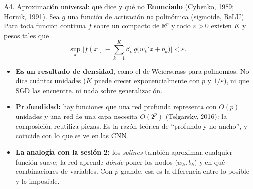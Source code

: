 \documentclass{beamer}
\newcommand{\1}{\mathbb{I}}
\begin{document}
\begin{frame}{A4. Aproximación universal: qué dice y qué no}
\small
\textbf{Enunciado} (Cybenko, 1989; Hornik, 1991). Sea $g$ una función de activación no polinómica (sigmoide, ReLU). Para toda función continua $f$ sobre un compacto de $\mathbb{R}^p$ y todo $\varepsilon > 0$ existen $K$ y pesos tales que
\[ \sup_{x} \Big| f(x) - \sum_{k=1}^{K} \beta_k\, g\big(w_k' x + b_k\big) \Big| < \varepsilon. \]
\pause
\begin{itemize}\itemsep3pt
  \item \textbf{Es un resultado de densidad}, como el de Weierstrass para polinomios. No dice cuántas unidades ($K$ puede crecer exponencialmente con $p$ y $1/\varepsilon$), ni que SGD las encuentre, ni nada sobre generalización.
  \item \textbf{Profundidad:} hay funciones que una red profunda representa con $O(p)$ unidades y una red de una capa necesita $O(2^p)$ (Telgarsky, 2016): la composición reutiliza piezas. Es la razón teórica de ``profundo y no ancho'', y coincide con lo que se ve en las CNN.
  \item \textbf{La analogía con la sesión 2:} los \emph{splines} también aproximan cualquier función suave; la red aprende \emph{dónde} poner los nodos ($w_k, b_k$) y en qué combinaciones de variables. Con $p$ grande, esa es la diferencia entre lo posible y lo imposible.
\end{itemize}
\end{frame}

\end{document}

